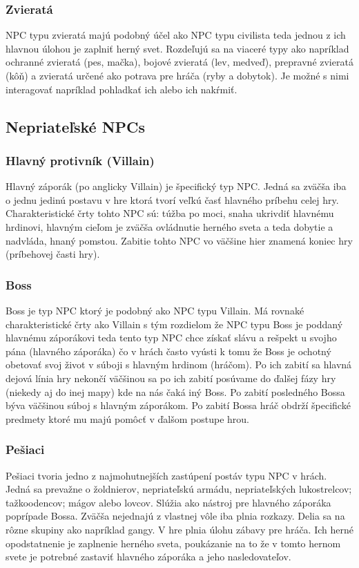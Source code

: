 \documentclass[10pt,twoside,slovak,a4paper]{article}
\begin{document}
\subsubsection{Zvieratá}
NPC typu zvieratá majú podobný účel ako NPC typu civilista teda jednou z ich hlavnou úlohou je zaplniť herný svet. Rozdeľujú sa na viaceré typy ako napríklad ochranné zvieratá (pes, mačka), bojové zvieratá (lev, medveď), prepravné zvieratá (kôň) a zvieratá určené ako potrava pre hráča (ryby a dobytok). Je možné s nimi interagovať napríklad pohladkať ich alebo ich nakŕmiť. 

\subsection{Nepriateľské NPCs} \label{enemy}

\subsubsection{Hlavný protivník (Villain)} \label{BOSS}
Hlavný záporák (po anglicky Villain) je špecifický typ NPC. Jedná sa zväčša iba o jednu jedinú postavu v hre ktorá tvorí veľkú časť hlavného príbehu celej hry. Charakteristické črty tohto NPC sú: túžba po moci, snaha ukrivdiť hlavnému hrdinovi, hlavným cieľom je zväčša ovládnutie herného sveta a teda dobytie a nadvláda, hnaný pomstou. Zabitie tohto NPC vo väčšine hier znamená koniec hry (príbehovej časti hry).

\subsubsection{Boss} \label{BOSS}
Boss je typ NPC ktorý je podobný ako NPC typu Villain. Má rovnaké charakteristické črty ako Villain s tým rozdielom že NPC typu Boss je poddaný hlavnému záporákovi teda tento typ NPC chce získať slávu a rešpekt u svojho pána (hlavného záporáka) čo v hrách často vyústi k tomu že Boss je ochotný obetovať svoj život v súboji s hlavným hrdinom (hráčom). Po ich zabití sa hlavná dejová línia hry nekončí väčšinou sa po ich zabití posúvame do ďalšej fázy hry (niekedy aj do inej mapy) kde na nás čaká iný Boss. Po zabití posledného Bossa býva väčšinou súboj s hlavným záporákom. Po zabití Bossa hráč obdrží špecifické predmety ktoré mu majú pomôcť v ďalšom postupe hrou. 

\subsubsection{Pešiaci} \label{Pesiaci}
Pešiaci tvoria jedno z najmohutnejších zastúpení postáv typu NPC v hrách. Jedná sa prevažne o žoldnierov, nepriateľskú armádu, nepriateľských lukostrelcov; tažkoodencov;  mágov alebo lovcov. Slúžia ako nástroj pre hlavného záporáka poprípade Bossa. Zväčša nejednajú z vlastnej vôle iba plnia rozkazy. Delia sa na rôzne skupiny ako napríklad gangy. V hre plnia úlohu zábavy pre hráča. Ich herné opodstatnenie je zaplnenie herného sveta, poukázanie na to že v tomto hernom svete je potrebné zastaviť hlavného záporáka a jeho nasledovateľov.  
\end{document}
